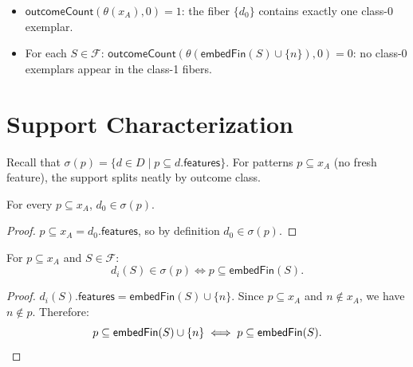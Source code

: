 \begin{lemma}
  \label{lem:outcome-counts}
  \leanok
  \begin{itemize}
    \item $\mathsf{outcomeCount}(\theta(x_A), 0) = 1$: the fiber $\{d_0\}$
      contains exactly one class-0 exemplar.
    \item For each $S \in \mathcal{F}$:
      $\mathsf{outcomeCount}(\theta(\mathsf{embedFin}(S) \cup \{n\}), 0) = 0$:
      no class-0 exemplars appear in the class-1 fibers.
  \end{itemize}
\end{lemma}

\section{Support Characterization}

Recall that $\sigma(p) = \{d \in D \mid p \subseteq d.\mathsf{features}\}$.
For patterns $p \subseteq x_A$ (no fresh feature), the support splits neatly by
outcome class.

\begin{lemma}
  \label{lem:d0-in-sigma}
  \leanok
  For every $p \subseteq x_A$, $d_0 \in \sigma(p)$.

  \begin{proof}
    $p \subseteq x_A = d_0.\mathsf{features}$, so by definition $d_0 \in
    \sigma(p)$.
  \end{proof}
\end{lemma}

\begin{lemma}
  \label{lem:di-in-sigma}
  \leanok
  For $p \subseteq x_A$ and $S \in \mathcal{F}$:
  \[
    d_i(S) \in \sigma(p)
    \iff p \subseteq \mathsf{embedFin}(S).
  \]

  \begin{proof}
    $d_i(S).\mathsf{features} = \mathsf{embedFin}(S) \cup \{n\}$.  Since $p
    \subseteq x_A$ and $n \notin x_A$, we have $n \notin p$.  Therefore:
    \[
      p \subseteq \mathsf{embedFin}(S) \cup \{n\}
      \iff p \subseteq \mathsf{embedFin}(S). \qedhere
    \]
  \end{proof}
\end{lemma}

